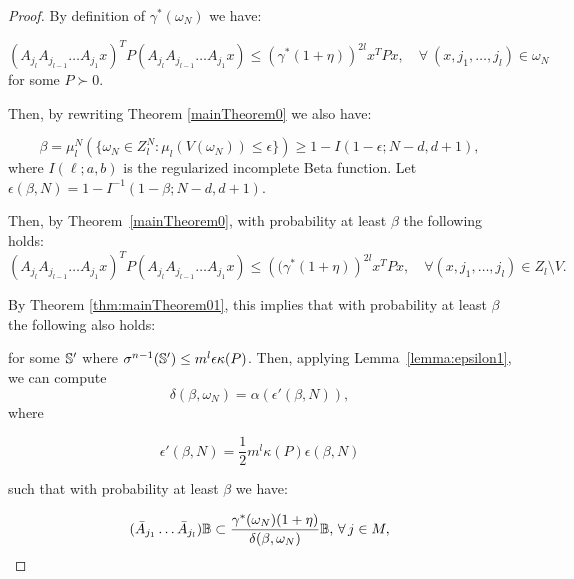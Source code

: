 \begin{proof}

By definition of $\gamma^*(\omega_N)$ we have:

\begin{equation*} 
(A_{j_l} A_{j_{l-1}} \dots A_{j_1} x)^T P (A_{j_l} A_{j_{l-1}} \dots A_{j_1} x) \leq (\gamma^{*}(1+\eta))^{2l} x^T P x, \quad \forall\ (x, j_1, \dots, j_l)  \in \omega_N 
\end{equation*}
for some $P \succ 0$. 

Then, by rewriting Theorem \ref{mainTheorem0} we also have:

\begin{equation}\label{eqn:violation2}
\beta = \mu_l^N \left( \{ \omega_N \in Z_l^N: \mu_l(V(\omega_N)) \leq \epsilon \} \right) \geq 1- I(1-\epsilon; N-d, d+1),
\end{equation}
where $I(\ell;a,b)$ is the regularized incomplete Beta function. Let $\epsilon(\beta, N)=1- I^{-1}(1-\beta; N-d, d+1)$. 

Then, by Theorem~\ref{mainTheorem0}, with probability at least $\beta$ the following holds:
\begin{equation*} 
(A_{j_l} A_{j_{l-1}} \dots A_{j_1} x)^T P (A_{j_l} A_{j_{l-1}} \dots A_{j_1} x) \leq  \left((\gamma^{*}(1+\eta) \right)^{2l} x^T P x, \quad \forall (x, j_1, \dots, j_l) \in Z_l \setminus V.
\end{equation*}

By Theorem \ref{thm:mainTheorem01}, this implies that with probability at least $\beta$ the following also holds:

%
%

for some $\mathbb{S}'$ where $\sigma^{n-1}(\mathbb{S}') \leq m^l \epsilon \kappa(P)$. Then, applying Lemma~\ref{lemma:epsilon1}, we can compute
$$\delta(\beta, \omega_N) =\alpha(\epsilon'(\beta,N)),$$
where

\begin{equation}\label{eqn:eps2}
\epsilon'(\beta, N) = \frac{1}{2} m^l \kappa(P) \epsilon(\beta,N)
\end{equation} 

such that with probability at least $\beta$ we have:

\begin{equation*}
(\bar{A}_{j_1} \dots \bar{A}_{j_l}) \mathbb{B} \subset \frac{\gamma^{*}(\omega_N)(1+\eta)}{\delta(\beta, \omega_N)}\mathbb{B},\, \forall\, j \in M,
\end{equation*}


\end{proof}

